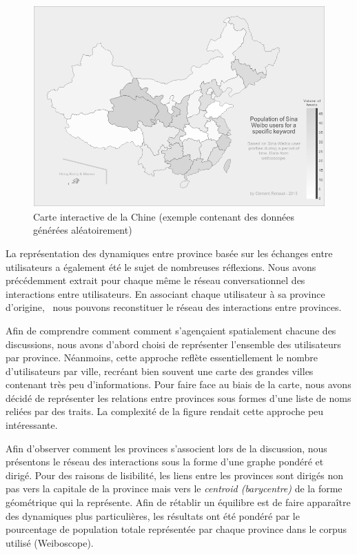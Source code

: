     \begin{figure}
        \centering
        \includegraphics[scale=0.4]{figures/chap4/ui/ui-map.png}
        \caption{Carte interactive de la Chine (exemple contenant des données générées aléatoirement)}
        \label{fig:ui-map}
    \end{figure}

    La représentation des dynamiques entre province basée sur les échanges entre utilisateurs a également été le sujet de nombreuses réflexions. Nous avons pr\'ec\'edemment extrait pour chaque m\^eme le r\'eseau conversationnel des interactions entre utilisateurs. En associant chaque utilisateur \`a sa province d{\textquoteright}origine, \ nous pouvons reconstituer le r\'eseau des interactions entre provinces. 

    Afin de comprendre comment comment s{\textquoteright}agençaient spatialement chacune des discussions, nous avons d'abord choisi de représenter l{\textquoteright}ensemble des utilisateurs par province. Néanmoins, cette approche reflète essentiellement le nombre d'utilisateurs par ville, recréant bien souvent une carte des grandes villes contenant très peu d'informations. Pour faire face au biais de la carte, nous avons décidé de représenter les relations entre provinces sous formes d'une liste de noms reliées par des traits. La complexité de la figure rendait cette approche peu intéressante.

    Afin d{\textquoteright}observer comment les provinces s{\textquoteright}associent lors de la discussion, nous pr\'esentons le r\'eseau des interactions sous la forme d{\textquoteright}une graphe pond\'er\'e et dirig\'e. Pour des raisons de lisibilit\'e, les liens entre les provinces sont dirig\'es non pas vers la capitale de la province mais vers le \textit{centroid (barycentre) }de la forme g\'eom\'etrique qui la repr\'esente. Afin de r\'etablir un \'equilibre est de faire appara\^itre des dynamiques plus particuli\`eres, les r\'esultats ont \'et\'e pond\'er\'e par le pourcentage de population totale repr\'esent\'ee par chaque province dans le corpus utilis\'e (Weiboscope).

